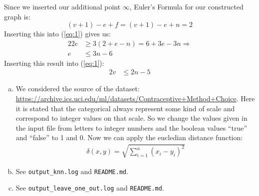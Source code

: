 \documentclass[10pt,a4paper,boxed]{hmcpset}
\begin{document}
\begin{solution}
\begin{enumerate}[(a)]
				Since we inserted our additional point $ \infty $, Euler's Formula for our constructed graph is:
				\[ (v+1)-e+f = (v+1)-e+n = 2 \]
				Inserting this into (\ref{eq:1}) gives us:
				\begin{alignat*}{2}
					2 e &\geq 3 (2 + e - n) = 6 + 3e - 3n \Rightarrow \\
					 e & \leq 3n - 6
				\end{alignat*}
				Inserting this result into (\ref{eq:1}):				
				\begin{alignat*}{2}
					v & \leq 2n - 5
				\end{alignat*}
				
									 
				
			\end{enumerate}
			
		\end{solution}		

		\begin{problem}[2. $k$-NN]
		\end{problem}
		\begin{solution}
			\begin{enumerate}[(a)]
				\item We considered the source of the dataset: 
					\url{https://archive.ics.uci.edu/ml/datasets/Contraceptive+Method+Choice}.
				Here it is stated that the categorical always
				represent some kind of scale and correspond to
				integer values on that scale. So we change the
				values given in the input file from letters to
				integer numbers and the boolean values ``true''
				and ``false'' to 1 and 0. Now we can apply the
				eucledian distance function:
				\begin{align}
					\delta (x,y) = \sqrt{ \sum_{i=1}^n (x_i-y_i)^2}
				\end{align}
			\item See \verb$output_knn.log$ and \verb$README.md$.
			\item See \verb$output_leave_one_out.log$ and \verb$README.md$.
			\end{enumerate}
		\end{solution}
		
		\pagebreak
		
		\begin{problem}		\end{problem}
\end{document}
